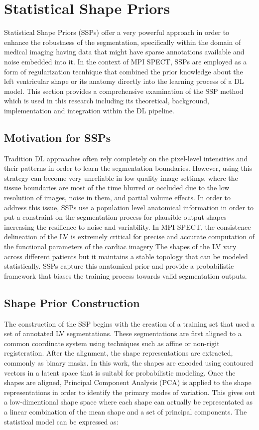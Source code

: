 \section{Statistical Shape Priors}
Statistical Shape Priors (SSPs) offer a very powerful approach in order to enhance the robustness of the segmentation, specifically within the domain of medical imaging having data that might have sparse annotations available and noise embedded into it. In the context of MPI SPECT, SSPs are employed as a form of regularization tecnhique that combined the prior knowledge about the left ventricular shape or its anatomy directly into the learning process of a DL model. This section provides a comprehensive examination of the SSP method which is used in this research including its theoretical, background, implementation and integration within the DL pipeline.

\subsection{Motivation for SSPs}
Tradition DL approaches often rely completely on the pixel-level intensities and their patterns in order to learn the segmentation boundaries. However, using this strategy can become very unreliable in low quality image settings, where the tissue boundaries are most of the time blurred or occluded due to the low resolution of images, noise in them, and partial volume effects. In order to address this issue, SSPs use a population level anatomical information in order to put a constraint on the segmentation process for plausible output shapes increasing the resilience to noise and variability. In MPI SPECT, the consistence delineation of the LV is extremely critical for precise and accurate computation of the functional parameters of the cardiac imagery The shapes of the LV vary across different patients but it maintains a stable topology that can be modeled statistically. SSPs capture this anatomical prior and provide a probabilistic framework that biases the training process towards valid segmentation outputs.

\subsection{Shape Prior Construction}
The construction of the SSP begins with the creation of a training set that used a set of annotated LV segmentations. These segmentations are first aligned to a common coordinate system using techniques such as affine or non-rigit registeration. After the alignment, the shape representations are extracted, commonly as binary masks. In this work, the shapes are encoded using contoured vectors in a latent space that is suitabl for probabilistic modeling. Once the shapes are aligned, Principal Component Analysis (PCA) is applied to the shape representations in order to identify the primary modes of variation. This gives out a low-dimentional shape space where each shape can actually be representated as a linear combination of the mean shape and a set of principal components. The statistical model can be expressed as:

